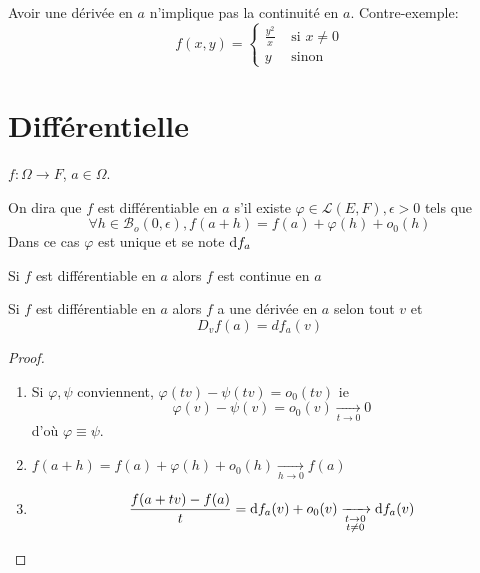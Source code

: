 \begin{rem}
    Avoir une dérivée en $a$ n'implique pas la continuité en $a$. Contre-exemple: \[
        f(x, y)=\begin{cases}
            \frac{y^2}x &\text{ si }x\neq 0\\ y & \text{ sinon}
        \end{cases}
    \]
\end{rem}

\section{Différentielle}

\begin{defprop}
    \Hyp $f:\Omega\longrightarrow F$, $a\in \Omega$. \begin{concenum}
    \item On dira que $f$ est différentiable en $a$ s'il existe $\varphi\in\mathcal L(E, F), \epsilon>0$ tels que \[
            \forall h\in\mathcal B_o(0, \epsilon), f(a+h)=f(a)+\varphi(h)+o_0(h)
        \]
        Dans ce cas $\varphi$ est unique et se note $\mathrm{d} f_a$
    \item Si $f$ est différentiable en $a$ alors $f$ est continue en $a$
    \item Si $f$ est différentiable en $a$ alors $f$ a une dérivée en $a$ selon tout $v$ et \[
            D_vf(a)=df_a(v)
        \]
    \end{concenum}
\end{defprop}

\begin{proof} ~
    \begin{enumerate}
        \item Si $\varphi, \psi$ conviennent, $\varphi(tv)-\psi(tv)=o_0(tv)$ ie \[
                \varphi(v)-\psi(v)=o_0(v)\xrightarrow[t\to 0]{}0
            \]
            d'où $\varphi\equiv \psi$.
        \item $f(a+h)=f(a)+\varphi(h)+o_0(h)\xrightarrow[h\to 0]{}f(a)$
        \item \[
                \frac{f(a+tv)-f(a)}{t}=\mathrm{d} f_a(v)+o_0(v)\xrightarrow[\substack{t\to 0\\t\neq 0}]{}\mathrm{d} f_a(v)
            \]
    \end{enumerate}
\end{proof}

